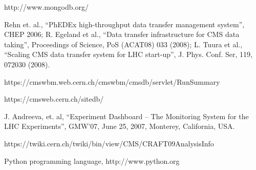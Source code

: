 \documentclass[a4paper]{jpconf}
\begin{document}
\begin{thebibliography}{9}
http://www.mongodb.org/


Rehn et. al.,
``PhEDEx high-throughput data transfer management system'', CHEP 2006;
R. Egeland et al., 
``Data transfer infrastructure for CMS data taking'', 
Proceedings of Science, PoS (ACAT08) 033 (2008);
L. Tuura et al., 
``Scaling CMS data transfer system for LHC start-up'', 
J. Phys. Conf. Ser, 119, 072030 (2008).

https://cmswbm.web.cern.ch/cmswbm/cmsdb/servlet/RunSummary

https://cmsweb.cern.ch/sitedb/




J. Andreeva, et. al,
``Experiment Dashboard – The Monitoring System for the LHC Experiments'',
GMW’07, June 25, 2007, Monterey, California, USA.

https://twiki.cern.ch/twiki/bin/view/CMS/CRAFT09AnalysisInfo

 Python programming language, http://www.python.org

\end{thebibliography}
\end{document}
